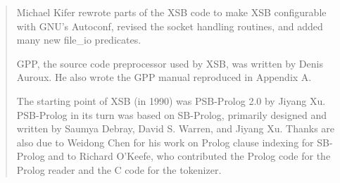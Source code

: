 \begin{quote}
Michael Kifer rewrote parts of the XSB code to make XSB configurable
with GNU's Autoconf, revised the socket handling routines, and added
many new file\_io predicates.  


GPP, the source code preprocessor used by XSB, was written by Denis Auroux.
He also wrote the GPP manual reproduced in Appendix A.

The starting point of XSB (in 1990) was PSB-Prolog 2.0 by Jiyang Xu.
PSB-Prolog in its turn was based on SB-Prolog, primarily designed and
written by Saumya Debray, David S. Warren, and Jiyang Xu.  Thanks are
also due to Weidong Chen for his work on Prolog clause indexing for
SB-Prolog and to Richard O'Keefe, who contributed the Prolog code for
the Prolog reader and the C code for the tokenizer.  

\end{quote}

